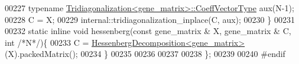 \begin{DoxyCode}
00227     \textcolor{keyword}{typename} \hyperlink{group___core___module}{Tridiagonalization<gene\_matrix>::CoeffVectorType}
       aux(N-1);
00228     C = X;
00229     internal::tridiagonalization\_inplace(C, aux);
00230   \}
00231 
00232   \textcolor{keyword}{static} \textcolor{keyword}{inline} \textcolor{keywordtype}{void} hessenberg(\textcolor{keyword}{const} gene\_matrix & X, gene\_matrix & C, \textcolor{keywordtype}{int}  \textcolor{comment}{/*N*/})\{
00233     C = \hyperlink{group___eigenvalues___module_class_eigen_1_1_hessenberg_decomposition}{HessenbergDecomposition<gene\_matrix>}(X).packedMatrix();
00234   \}
00235 
00236 
00237 
00238 \};
00239 
00240 \textcolor{preprocessor}{#endif}
\end{DoxyCode}
